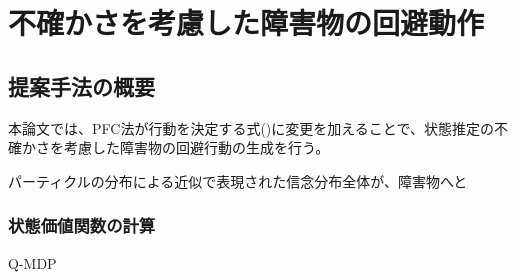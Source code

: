 \chapter{不確かさを考慮した障害物の回避動作} \label{chapter:mechod}


\section{提案手法の概要}

本論文では、PFC法が行動を決定する式()に変更を加えることで、状態推定の不確かさを考慮した障害物の回避行動の生成を行う。

パーティクルの分布による近似で表現された信念分布全体が、障害物へと


\subsection{状態価値関数の計算}

Q-MDP

\subsection{}
